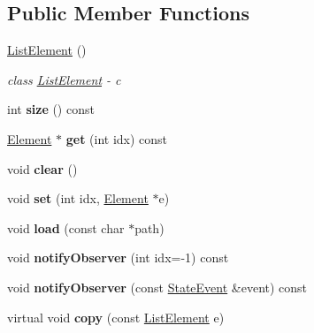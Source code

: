 \subsection*{Public Member Functions}
\begin{DoxyCompactItemize}
\item 
\mbox{\label{classstate_1_1_list_element_a1471bc2a449803cfd9932ed15f153654}} 
\hyperlink{classstate_1_1_list_element_a1471bc2a449803cfd9932ed15f153654}{List\+Element} ()
\begin{DoxyCompactList}\small\item\em class \hyperlink{classstate_1_1_list_element}{List\+Element} -\/ c \end{DoxyCompactList}\item 
\mbox{\label{classstate_1_1_list_element_a70fef2b8268f830bdf7295d4c05c422c}} 
int {\bfseries size} () const
\item 
\mbox{\label{classstate_1_1_list_element_a514900215f7548c74e2f3290ff5e4d1c}} 
\hyperlink{classstate_1_1_element}{Element} $\ast$ {\bfseries get} (int idx) const
\item 
\mbox{\label{classstate_1_1_list_element_ab7b04acd17cd9281f269b24e43a202ed}} 
void {\bfseries clear} ()
\item 
\mbox{\label{classstate_1_1_list_element_af9d588bb5d6c19a90a997d03d2fc538f}} 
void {\bfseries set} (int idx, \hyperlink{classstate_1_1_element}{Element} $\ast$e)
\item 
\mbox{\label{classstate_1_1_list_element_a5a6f3a66e07bfca10a817d2b55702f16}} 
void {\bfseries load} (const char $\ast$path)
\item 
\mbox{\label{classstate_1_1_list_element_a2ea8ec069e8691d7d3300792091280a8}} 
void {\bfseries notify\+Observer} (int idx=-\/1) const
\item 
\mbox{\label{classstate_1_1_list_element_ae60d45d8fab384b8ad942dc337ee273e}} 
void {\bfseries notify\+Observer} (const \hyperlink{classstate_1_1_state_event}{State\+Event} \&event) const
\item 
\mbox{\label{classstate_1_1_list_element_a00524c983fc53699699e9ff5929103e7}} 
virtual void {\bfseries copy} (const \hyperlink{classstate_1_1_list_element}{List\+Element} e)
\end{DoxyCompactItemize}
